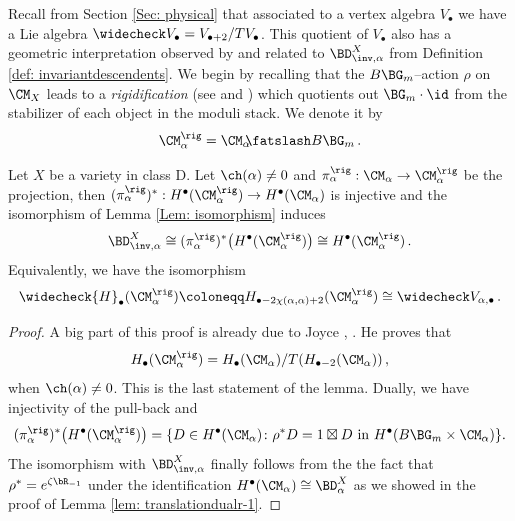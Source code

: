 Recall from Section \ref{Sec: physical} that associated to a vertex algebra $V_\bullet$ we have a Lie algebra $\widecheck V_\bullet=V_{\bullet+2}/TV_\bullet$. This quotient of $V_{\bullet}$ also has a geometric interpretation observed by \cite{Jo17} and related to $\BD^X_{\inv, \alpha}$ from Definition \ref{def: invariantdescendents}. We begin by recalling that the $B\BG_m$--action $\rho$ on $\CM_X$ leads to a \textit{rigidification} (see \cite[Appendix]{AOV} and \cite[Proposition 2.25 (b)]{Jo17}) which quotients out $\BG_m\cdot \id$ from the stabilizer of each object in the moduli stack. We denote it by
$$
\CM_\alpha^\rig=\CM_\alpha \mkern-7mu\fatslash B\BG_m\,.
$$
\begin{lemma}
\notready
\label{Lem: DXinv}
Let $X$ be a variety in class D. Let $\ch(\alpha)\neq 0$ and $\pi^{\rig}_{\alpha}: \CM_\alpha\to \CM^{\rig}_\alpha$ be the projection, then $(\pi^{\rig}_\alpha)^\ast: H^\bullet(\CM^{\rig}_\alpha)\to H^\bullet(\CM_{\alpha})$ is injective and the isomorphism of Lemma \ref{Lem: isomorphism} induces
$$
\BD^X_{\inv,\alpha}\cong(\pi^{\rig}_{\alpha})^\ast\big(H^\bullet(\CM^{\rig}_{\alpha})\big)\cong H^\bullet(\CM^{\rig}_{\alpha})\,.
$$
Equivalently, we have the isomorphism
$$
\widecheck{H}_{\bullet}(\CM^{\rig}_{\alpha}) \coloneqq H_{\bullet-2\chi(\alpha,\alpha)+2}(\CM^{\rig}_\alpha)\cong \widecheck V_{\alpha, \bullet}\,.
$$
\end{lemma}
\begin{proof}
A big part of this proof is already due to Joyce \cite[Proposition 3.24]{Jo17}, \cite[Theorem 4.8, Remark 4.10]{Jo21}. He proves that
$$
H_\bullet(\CM^{\rig}_{\alpha}) =H_\bullet(\CM_\alpha)/T(H_{\bullet-2}(\CM_\alpha))\,,
$$
when $\ch(\alpha)\neq 0$. This is the last statement of the lemma. Dually, we have injectivity of the pull-back and
\[(\pi^{\rig}_{\alpha})^\ast\big(H^\bullet(\CM^{\rig}_{\alpha})\big) =\{D\in H^\bullet(\CM_{\alpha}) \colon \rho^*D = 1\boxtimes D \textup{ in }H^\bullet(B \BG_m\times \CM_\alpha) \}.\] The isomorphism with $\BD^X_{\inv,\alpha}$ finally follows from the the fact that $\rho^\ast=e^{\zeta \bR_{-1}}$ under the identification $H^\bullet(\CM_\alpha)\cong \BD^X_\alpha$ as we showed in the proof of Lemma \ref{lem: translationdualr-1}.
\end{proof}

